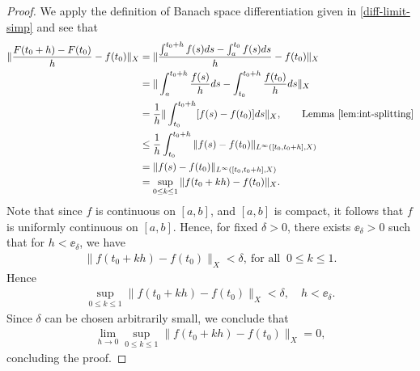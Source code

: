 \begin{proof}
We apply the definition of Banach space
differentiation given in \eqref{diff-limit-simp} and see that
%
%
\begin{equation*}
\begin{split}
   \| \frac{F(t_{0} + h) - F(t_{0})}{h}  - f(t_{0}) \|_{X}
  & = \| \frac{\int_{a}^{t_{0}+h}f(s)ds - \int_{a}^{t_{0}}f(s)ds}{h} -
  f(t_{0}) \|_{X}
  \\
  & = \| \int_{a}^{t_{0}+h}\frac{f(s)}{h}ds  -
  \int_{t_{0}}^{t_{0} + h} \frac{f(t_{0})}{h} ds \|_{X}
  \\
  & = \frac{1}{h} \| \int_{t_{0}}^{t_{0} + h}[f(s) - f(t_{0})]ds \|_{X}, \qquad
  \text{Lemma \ref{lem:int-splitting}}
  \\
  & \le \frac{1}{h} \int_{t_{0}}^{t_{0} + h} \| f(s) - f(t_{0})
  \|_{L^{\infty}\left( [t_{0}, t_{0} + h], X \right)}
  \\
  & = \| f(s) - f(t_{0})
  \|_{L^{\infty}\left( [t_{0}, t_{0} + h], X \right)}
  \\
  & = \sup_{0 \le k \le 1} \| f(t_{0} + kh) - f(t_{0})
  \|_{X}.
\end{split}
\end{equation*}
%
%
Note that since $f$ is continuous on $[a,b]$, and $[a,b]$ is compact, it follows
that $f$ is uniformly continuous on $[a,b]$. Hence, for fixed $\delta > 0$,
there exists $\ee_{\delta} > 0$ such that for $h < \ee_{\delta}$, we have
%
%
\begin{equation*}
\begin{split}
  \| f(t_{0} + kh) - f(t_{0}) \|_{X} < \delta, \ \text{for all } \  0 \le k \le 1.
\end{split}
\end{equation*}
%
%
Hence
%
%
%
\begin{equation*}
\begin{split}
  \sup_{0 \le k \le 1} \| f(t_{0} + kh) - f(t_{0}) \|_{X} < \delta, \quad h <
  \ee_{\delta}.
\end{split}
\end{equation*}
%
%
Since $\delta$ can be chosen arbitrarily small, we conclude that
%
\begin{equation*}
\begin{split}
  \lim_{h \to 0} \sup_{0 \le k \le 1} \| f(t_{0} + kh) - f(t_{0})
  \|_{X} = 0,
\end{split}
\end{equation*}
%
%
concluding the proof.
\end{proof}
%
%
%
%
%
%
%
%
%
%
%
%
%
%
